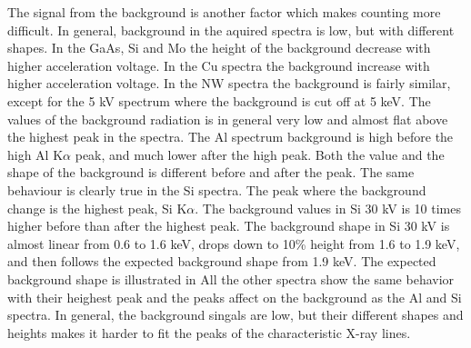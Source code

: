 The signal from the background is another factor which makes counting more difficult.
In general, background in the aquired spectra is low, but with different shapes.
In the GaAs, Si and Mo the height of the background decrease with higher acceleration voltage.
In the Cu spectra the background increase with higher acceleration voltage.
In the NW spectra the background is fairly similar, except for the 5 kV spectrum where the background is cut off at 5 keV. %
The values of the background radiation is in general very low and almost flat above the highest peak in the spectra. %
The Al spectrum background is high before the high Al K$\alpha$ peak, and much lower after the high peak.
Both the value and the shape of the background is different before and after the peak.
The same behaviour is clearly true in the Si spectra.
The peak where the background change is the highest peak, Si K$\alpha$.
The background values in Si 30 kV is 10 times higher before than after the highest peak.
The background shape in Si 30 kV is almost linear from 0.6 to 1.6 keV, drops down to 10\% height from 1.6 to 1.9 keV, and then follows the expected background shape from 1.9 keV.
The expected background shape is illustrated in  %
All the other spectra show the same behavior with their heighest peak and the peaks affect on the background as the Al and Si spectra.
In general, the background singals are low, but their different shapes and heights makes it harder to fit the peaks of the characteristic X-ray lines.



